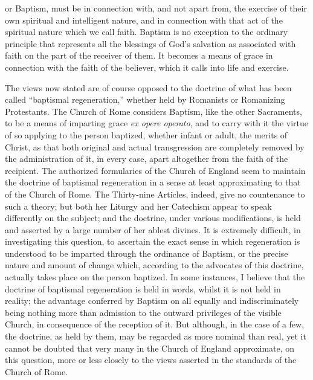 \documentclass[
  english,
]{book}
\providecommand{\textlatin}{}
\renewcommand{\textlatin}[2][]{\foreignlanguage{latin}{#2}}
\begin{document}
or Baptism, must be in connection with, and not apart from, the exercise of their own spiritual and intelligent nature, and in connection with that act of the spiritual nature which we call faith. Baptism is no exception to the ordinary principle that represents all the blessings of God's salvation as associated with faith on the part of the receiver of them. It becomes a means of grace in connection with the faith of the believer, which it calls into life and exercise.

The views now stated are of course opposed to the doctrine of what has been called ``baptismal regeneration,'' whether held by Romanists or Romanizing Protestants. The Church of Rome considers Baptism, like the other Sacraments, to be a means of imparting grace \textlatin{\emph{ex opere operato}}, and to carry with it the virtue of so applying to the person baptized, whether infant or adult, the merits of Christ, as that both original and actual transgression are completely removed by the administration of it, in every case, apart altogether from the faith of the recipient. The authorized formularies of the Church of England seem to maintain the doctrine of baptismal regeneration in a sense at least approximating to that of the Church of Rome. The Thirty-nine Articles, indeed, give no countenance to such a theory; but both her Liturgy and her Catechism appear to speak differently on the subject; and the doctrine, under various modifications, is held and asserted by a large number of her ablest divines. It is extremely difficult, in investigating this question, to ascertain the exact sense in which regeneration is understood to be imparted through the ordinance of Baptism, or the precise nature and amount of change which, according to the advocates of this doctrine, actually takes place on the person baptized. In some instances, I believe that the doctrine of baptismal regeneration is held in words, whilst it is not held in reality; the advantage conferred by Baptism on all equally and indiscriminately being nothing more than admission to the outward privileges of the visible Church, in consequence of the reception of it. But although, in the case of a few, the doctrine, as held by them, may be regarded as more nominal than real, yet it cannot be doubted that very many in the Church of England approximate, on this question, more or less closely to the views asserted in the standards of the Church of Rome.
\end{document}
